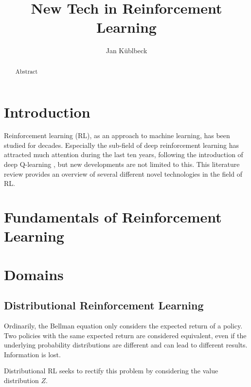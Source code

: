 \documentclass[runningheads]{llncs}
\begin{document}
%
\title{New Tech in Reinforcement Learning}
%
%
\author{Jan Küblbeck}
%
%
%
\maketitle              %
%
\begin{abstract}
Abstract
\end{abstract}
%
%
%
\section{Introduction}

Reinforcement learning (RL), as an approach to machine learning, has been studied for decades. Especially the sub-field of deep reinforcement learning has attracted much attention during the last ten years, following the introduction of deep Q-learning \cite{mnih2013playing}, but new developments are not limited to this. This literature review provides an overview of several different novel technologies in the field of RL.

\section{Fundamentals of Reinforcement Learning}

\section{Domains}

\subsection{Distributional Reinforcement Learning}

Ordinarily, the Bellman equation only considers the expected return of a policy. Two policies with the same expected return are considered equivalent, even if the underlying probability distributions are different and can lead to different results. Information is lost.

Distributional RL seeks to rectify this problem by considering the value distribution $Z$.\cite{bellemare2017distributional}
\end{document}
